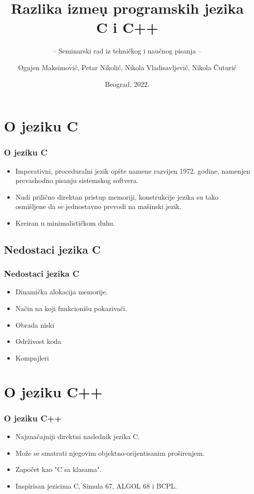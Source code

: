 \documentclass{beamer}
\title{Razlika izme\d u programskih jezika C i C++}
\subtitle{-- Seminarski rad iz tehničkog i naučnog pisanja --}
\author{Ognjen Maksimović, Petar Nikolić, Nikola Vladisavljević, Nikola Čuturić}
\institute{Matematički fakultet\\Univerzitet u Beogradu}
\date{
	\footnotesize{Beograd, 2022.}	
}
\begin{document}
\begin{frame}
	\thispagestyle{empty}
	\titlepage
\end{frame}

\addtocounter{framenumber}{-1}

\section{O jeziku C}

\begin{frame}[fragile]\frametitle{O jeziku C}
	\begin{itemize}
		\item Imperativni, proceduralni jezik opšte namene razvijen 1972. godine, namenjen prevashodno pisanju sistemskog softvera.
            \item Nudi prilično direktan pristup memoriji, konstrukcije jezika su tako osmišljene da se jednostavno prevodi na mašinski jezik.
            \item Kreiran u minimalističkom duhu.
	\end{itemize}
\end{frame}

\subsection{Nedostaci jezika C}

\begin{frame}[fragile]\frametitle{Nedostaci jezika C}
	\begin{itemize}
	    \item Dinamička alokacija memorije.
		\item Način na koji funkcionišu pokazivači.
        \item Obrada niski
        \item Održivost koda
        \item Kompajleri
	\end{itemize}
\end{frame}

\section{O jeziku C++}

\begin{frame}[fragile]\frametitle{O jeziku C++}
	\begin{itemize}
		\item Najznačajniji direktni naslednik jezika C.
            \item Može se smatrati njegovim objektno-orijentisanim proširenjem.
            \item Započet kao "C sa klasama".
            \item Inspirisan jezicima C, Simula 67, ALGOL 68 i BCPL.
	\end{itemize}
\end{frame}
\end{document}
